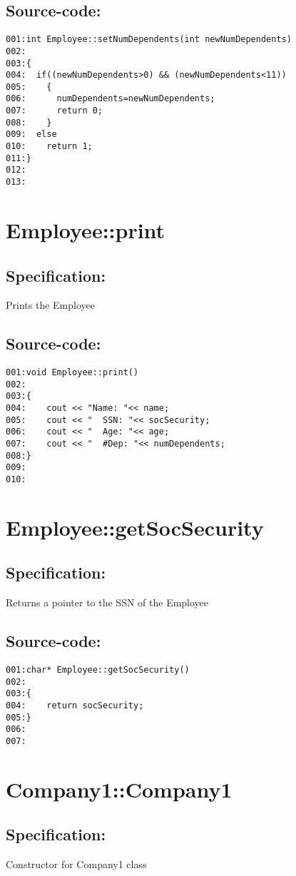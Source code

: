 \subsection*{Source-code:}
\begin{verbatim}
001:int Employee::setNumDependents(int newNumDependents) 
002:  
003:{
004:  if((newNumDependents>0) && (newNumDependents<11))
005:    {
006:      numDependents=newNumDependents;
007:      return 0;
008:    }
009:  else
010:    return 1;
011:}
012:
013:
\end{verbatim}
\section{Employee::print}
\subsection*{Specification:}
Prints the Employee
\subsection*{Source-code:}
\begin{verbatim}
001:void Employee::print()
002:
003:{
004:    cout << "Name: "<< name;
005:    cout << "  SSN: "<< socSecurity;
006:    cout << "  Age: "<< age;
007:    cout << "  #Dep: "<< numDependents;
008:}
009:
010:
\end{verbatim}
\section{Employee::getSocSecurity}
\subsection*{Specification:}
Returns a pointer to the SSN of the Employee
\subsection*{Source-code:}
\begin{verbatim}
001:char* Employee::getSocSecurity() 
002:
003:{
004:    return socSecurity;
005:}
006:
007:
\end{verbatim}
\section{Company1::Company1}
\subsection*{Specification:}
Constructor for Company1 class
